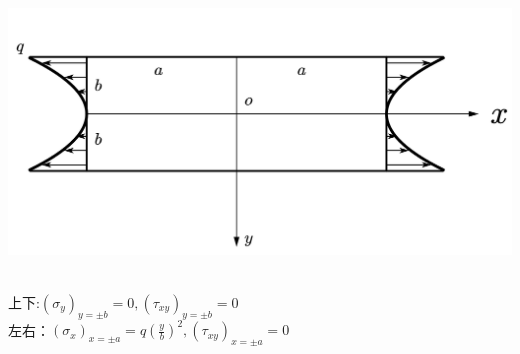\begin{example}
\end{example}
\centerline{\includegraphics[scale=0.5]{figure/2-4.png}}
\begin{remark}
	\quad\\
	上下:$\left( \sigma _y \right) _{y=\pm b}=0,\left( \tau _{xy} \right) _{y=\pm b}=0$\\
	左右：$\left( \sigma _x \right) _{x=\pm a}=q\left( \frac{y}{b} \right) ^2,\left( \tau _{xy} \right) _{x=\pm a}=0$
\end{remark}

